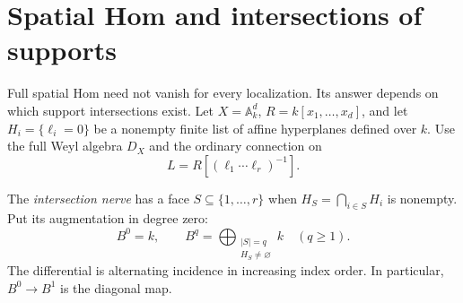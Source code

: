 \section{Spatial Hom and intersections of supports}
\label{cbc:ac:spatial-supports}

Full spatial Hom need not vanish for every
localization. Its answer depends on which support
intersections exist. Let $X=\mathbb A_k^d$,
$R=k[x_1,\ldots,x_d]$, and let
$H_i=\{\ell_i=0\}$ be a nonempty finite list of
affine hyperplanes defined over $k$. Use the full Weyl
algebra $D_X$ and the ordinary connection on
\[
 L=R[(\ell_1\cdots\ell_r)^{-1}].
\]

The \emph{intersection nerve} has a face
$S\subseteq\{1,\ldots,r\}$ when
$H_S=\bigcap_{i\in S}H_i$ is nonempty.
Put its augmentation in degree zero:
\begin{equation}\label{cbc:ac:nerve-complex}
 B^0=k,\qquad
 B^q=\bigoplus_{\substack{|S|=q\\H_S\ne\varnothing}}k
                       \quad(q\geq1).
\end{equation}
The differential is alternating incidence in
increasing index order. In particular,
$B^0\to B^1$ is the diagonal map.

